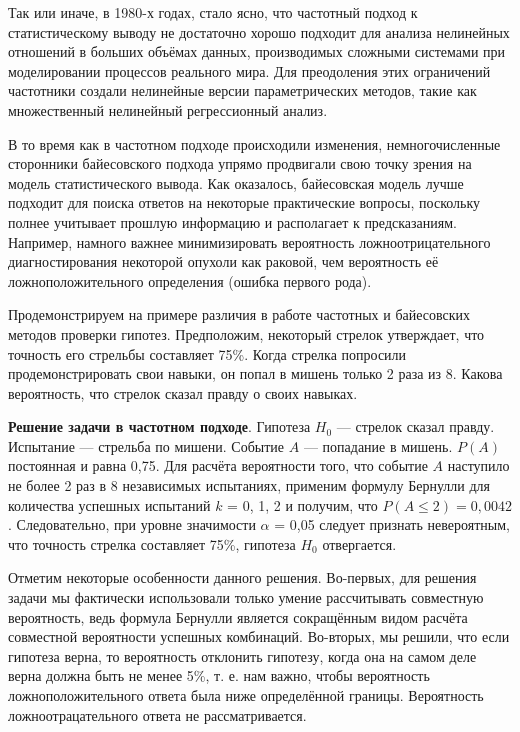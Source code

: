 Так или иначе, в 1980-х годах, стало ясно, что частотный подход к статистическому выводу не достаточно хорошо подходит для анализа нелинейных отношений в больших объёмах данных, производимых сложными системами при моделировании процессов реального мира\cite[стр. 10]{handbook_stat_dm}. Для преодоления этих ограничений частотники создали нелинейные версии параметрических методов, такие как множественный нелинейный регрессионный анализ.

В то время как в частотном подходе происходили изменения, немногочисленные сторонники байесовского подхода упрямо продвигали свою точку зрения на модель статистического вывода. Как оказалось, байесовская модель лучше подходит для поиска ответов на некоторые практические вопросы, поскольку полнее учитывает прошлую информацию и располагает к предсказаниям. Например, намного важнее минимизировать вероятность ложноотрицательного диагностирования некоторой опухоли как раковой, чем вероятность её ложноположительного определения (ошибка первого рода). 

Продемонстрируем на примере различия в работе частотных и байесовских методов проверки гипотез. Предположим, некоторый стрелок утверждает, что точность его стрельбы составляет 75\%. Когда стрелка попросили продемонстрировать свои навыки, он попал в мишень только 2 раза из 8. Какова вероятность, что стрелок сказал правду о своих навыках.

\textbf{Решение задачи в частотном подходе}. Гипотеза $H_{0}$ --- стрелок сказал правду. Испытание --- стрельба по мишени. Событие $A$ --- попадание в мишень. $P(A)$ постоянная и равна 0,75. Для расчёта вероятности того, что событие $A$ наступило не более 2 раз в 8 независимых испытаниях, применим формулу Бернулли для количества успешных испытаний $k$ = 0, 1, 2 и получим, что $P(A\leq 2)=0,0042$. Следовательно, при уровне значимости $\alpha$ = 0,05 следует признать невероятным, что точность стрелка составляет 75\%, гипотеза $H_{0}$ отвергается. 

Отметим некоторые особенности данного решения. Во-первых, для решения задачи мы фактически использовали только умение рассчитывать совместную вероятность, ведь формула Бернулли является сокращённым видом расчёта совместной вероятности успешных комбинаций. Во-вторых, мы решили, что если гипотеза верна, то вероятность отклонить гипотезу, когда она на самом деле верна должна быть не менее 5\%, т. е. нам важно, чтобы вероятность ложноположительного ответа была ниже определённой границы. Вероятность ложноотрацательного ответа не рассматривается.

